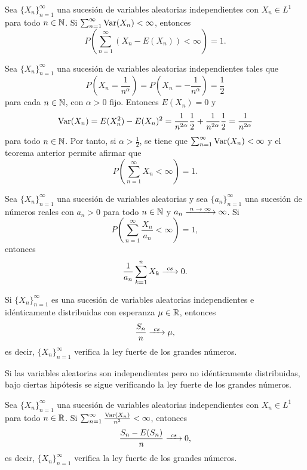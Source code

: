 \documentclass[a4paper, 11pt, extrafontsizes]{memoir}
\begin{document}
\begin{theorem}
    Sea $\{X_n\}_{n=1}^\infty$ una sucesión de variables aleatorias independientes con $X_n \in L^1$ para todo $n \in \mathbb N$. Si $\sum_{n=1}^\infty \textup{Var}(X_n) < \infty$, entonces
    \[P\left(\sum_{n=1}^\infty (X_n-E(X_n)) < \infty\right) = 1.\]
\end{theorem}

\begin{example}
    Sea $\{X_n\}_{n=1}^\infty$ una sucesión de variables aleatorias independientes tales que
    \[P\left(X_n = \frac{1}{n^\alpha}\right) = P\left(X_n = -\frac{1}{n^\alpha}\right) = \frac{1}{2}\]
    para cada $n \in \mathbb N$, con $\alpha > 0$ fijo. Entonces $E(X_n) = 0$ y 
    \[\textup{Var}(X_n) = E(X_n^2)-E(X_n)^2 = \frac{1}{n^{2\alpha}}\frac{1}{2}+\frac{1}{n^{2\alpha}}\frac{1}{2} = \frac{1}{n^{2\alpha}}\]
    para todo $n \in \mathbb N$. Por tanto, si $\alpha > \frac{1}{2}$, se tiene que $\sum_{n=1}^\infty \textup{Var}(X_n)<\infty$ y el teorema anterior permite afirmar que
    \[P\left(\sum_{n=1}^\infty X_n < \infty\right) = 1.\]
\end{example}

\begin{theorem}\label{teo:4.5.7}
    Sea $\{X_n\}_{n=1}^\infty$ una sucesión de variables aleatorias y sea $\{a_n\}_{n=1}^\infty$ una sucesión de números reales con $a_n > 0$ para todo $n \in \mathbb N$ y $a_n \nconv \infty$. Si
    \[P\left(\sum_{n=1}^\infty \frac{X_n}{a_n} < \infty\right) = 1,\]
    entonces
    \[\frac{1}{a_n}\sum_{k=1}^n X_k \csconv 0.\]
\end{theorem}

\begin{theorem}
    Si $\{X_n\}_{n=1}^\infty$ es una sucesión de variables aleatorias independientes e idénticamente distribuidas con esperanza $\mu \in \mathbb R$, entonces
    \[\frac{S_n}{n} \csconv \mu,\]
    es decir, $\{X_n\}_{n=1}^\infty$ verifica la ley fuerte de los grandes números.
\end{theorem}

Si las variables aleatorias son independientes pero no idénticamente distribuidas, bajo ciertas hipótesis se sigue verificando la ley fuerte de los grandes números.

\begin{theorem}\label{teo:4.6.9}
    Sea $\{X_n\}_{n=1}^\infty$ una sucesión de variables aleatorias independientes con $X_n \in L^1$ para todo $n \in \mathbb R$. Si $\sum_{n=1}^\infty \frac{\textup{Var}(X_n)}{n^2} < \infty$, entonces
    \[\frac{S_n-E(S_n)}{n} \csconv 0,\]
    es decir, $\{X_n\}_{n=1}^\infty$ verifica la ley fuerte de los grandes números.
\end{theorem}
\end{document}
